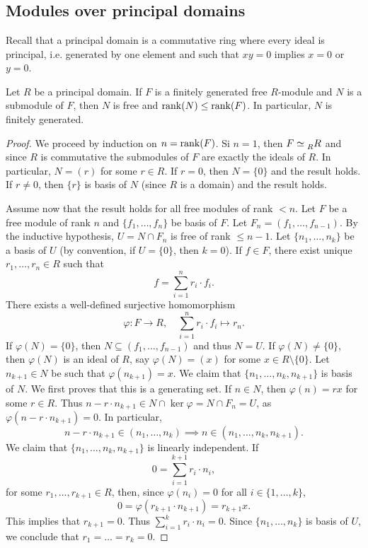 \section{}


\subsection{Modules over principal domains}

Recall that a principal domain is a commutative ring where 
every ideal is principal, i.e. generated by one element and 
such that $xy=0$ implies $x=0$ or $y=0$. 

\begin{theorem}
\label{thm:rango}
Let $R$ be a principal domain. If $F$ is a finitely generated free $R$-module and 
$N$ is a submodule of $F$, then $N$ is free and 
$\operatorname{rank}(N)\leq\operatorname{rank}(F)$. In particular, $N$ is finitely generated. 
\end{theorem}

\begin{proof}
	We proceed by induction on $n=\operatorname{rank}(F)$. Si $n=1$, then
	$F\simeq\prescript{}{R}R$ 
	and since $R$ is commutative the submodules of $F$ are exactly the ideals of $R$. In particular,
	$N=(r)$ for some $r\in R$. If $r=0$, then $N=\{0\}$ and the result holds. If $r\ne 0$, then 
	$\{r\}$ is basis of $N$ (since $R$ is a domain) and the result holds.
	
	Assume now that the result holds for all free modules of rank $<n$. Let $F$ be a free module of
	rank $n$ and 
	$\{f_1,\dots,f_n\}$ be basis of $F$. Let $F_n=(f_1,\dots,f_{n-1})$. By the inductive hypothesis, 
	$U=N\cap F_n$ is free of rank $\leq n-1$. Let 
	$\{n_1,\dots,n_k\}$ be a basis of $U$ (by convention, if $U=\{0\}$, then $k=0$). If 
	$f\in F$, there exist unique $r_1,\dots,r_n\in R$ such that  
	\[
	f=\sum_{i=1}^n r_i\cdot f_i.
	\]
	There exists a well-defined surjective homomorphism 
	\[
	\varphi\colon F\to R,
	\quad
	\sum_{i=1}^nr_i\cdot f_i\mapsto r_n.
	\] 
	If $\varphi(N)=\{0\}$, then $N\subseteq (f_1,\dots,f_{n-1})$ and thus $N=U$. 
	If $\varphi(N)\ne\{0\}$, then $\varphi(N)$ is an ideal of 
	$R$, say $\varphi(N)=(x)$ for some $x\in R\setminus\{0\}$. Let $n_{k+1}\in N$ 
	be such that $\varphi(n_{k+1})=x$. 
    We claim that $\{n_1,\dots,n_k,n_{k+1}\}$ is basis of $N$. We first proves that 
    this is a generating set. 
	If $n\in N$, then $\varphi(n)=rx$ 
	for some $r\in R$. Thus $n-r\cdot n_{k+1}\in N\cap\ker\varphi=N\cap F_n=U$, as  
	$\varphi(n-r\cdot n_{k+1})=0$. In particular, 
	\[
	n-r\cdot n_{k+1}\in (n_1,\dots,n_k)\implies  
	n\in (n_1,\dots,n_k,n_{k+1}).
	\]
	We claim that 
	$\{n_1,\dots,n_k,n_{k+1}\}$ is linearly independent. If 
	\[
	0=\sum_{i=1}^{k+1}r_i\cdot n_i,
	\]
	for some $r_1,\dots,r_{k+1}\in R$, then, since 
	$\varphi(n_i)=0$ for all $i\in\{1,\dots,k\}$,
	\[
	0=\varphi(r_{k+1}\cdot n_{k+1})=r_{k+1}x.
	\]
	This implies that $r_{k+1}=0$. Thus $\sum_{i=1}^kr_i\cdot n_i=0$. Since
	$\{n_1,\dots,n_k\}$ is basis of $U$, we conclude that 
	$r_1=\dots=r_k=0$. 
\end{proof}

